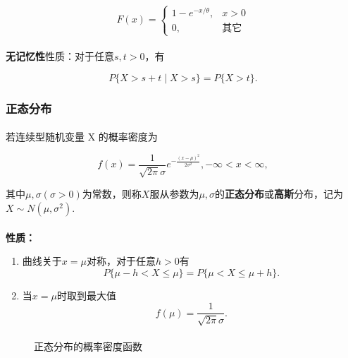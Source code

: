 \begin{equation}
  F(x) = \left\{ \begin{array}{ll}
    1 - e^{-x/\theta}, & x > 0 \\ 0, & \text{其它}
  \end{array} \right.
\end{equation}

\paragraph{}
\textbf{无记忆性}性质：对于任意$s,t>0$，有

\begin{equation}
  P\{X > s + t \;|\; X > s\} = P\{X > t\}.
\end{equation}

\subsubsection{正态分布}
\paragraph{}
若连续型随机变量 X 的概率密度为

\begin{equation}
  \label{正态分布公式}
  f(x) = \frac{1}{\sqrt{2\pi}\sigma}e^{-\frac{(x-\mu)^2}{2\sigma^2}}, -\infty < x < \infty,
\end{equation}

其中$\mu, \sigma(\sigma > 0)$为常数，则称$X$服从参数为$\mu, \sigma$的\textbf{正态分布}或\textbf{高斯}分布，记为$X\sim N(\mu, \sigma^2)$.

\paragraph{}
\textbf{性质：}
\begin{enumerate}
  \item 曲线关于$x=\mu$对称，对于任意$h > 0$有
  \begin{equation}
    P\{\mu-h < X \leq \mu\} = P\{\mu < X \leq \mu+h\}.
  \end{equation}
  \item 当$x=\mu$时取到最大值
  \begin{equation}
    f(\mu) = \frac{1}{\sqrt{2\pi}\sigma}.
  \end{equation}
\end{enumerate}

\paragraph{}
\begin{figure}[H]
\centering
  \begin{subfigure}[t]{0.48\linewidth}
    \centering
      
  \end{subfigure}
  \begin{subfigure}[t]{0.48\linewidth}
    \centering
      
  \end{subfigure}
  \caption{正态分布的概率密度函数}
  \label{正态分布的概率密度函数}
\end{figure}

